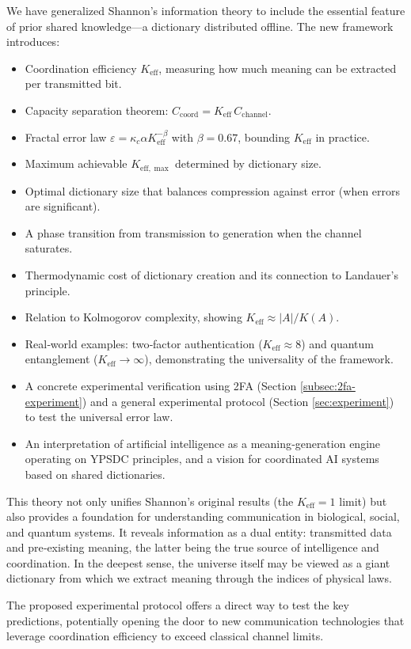 \documentclass[12pt,a4paper]{article}
\theoremstyle{remark}
\newcommand{\Keff}{K_{\mathrm{eff}}}
\newcommand{\Keffmax}{K_{\mathrm{eff},\max}}
\begin{document}
	We have generalized Shannon's information theory to include the essential feature of prior shared knowledge—a dictionary distributed offline. The new framework introduces:
	\begin{itemize}
		\item Coordination efficiency $\Keff$, measuring how much meaning can be extracted per transmitted bit.
		\item Capacity separation theorem: $C_{\text{coord}} = \Keff \, C_{\text{channel}}$.
		\item Fractal error law $\varepsilon = \kappa_c\alpha \Keff^{-\beta}$ with $\beta=0.67$, bounding $\Keff$ in practice.
		\item Maximum achievable $\Keffmax$ determined by dictionary size.
		\item Optimal dictionary size that balances compression against error (when errors are significant).
		\item A phase transition from transmission to generation when the channel saturates.
		\item Thermodynamic cost of dictionary creation and its connection to Landauer's principle.
		\item Relation to Kolmogorov complexity, showing $\Keff \approx |A|/K(A)$.
		\item Real‑world examples: two‑factor authentication ($\Keff \approx 8$) and quantum entanglement ($\Keff \to \infty$), demonstrating the universality of the framework.
		\item A concrete experimental verification using 2FA (Section \ref{subsec:2fa-experiment}) and a general experimental protocol (Section \ref{sec:experiment}) to test the universal error law.
		\item An interpretation of artificial intelligence as a meaning‑generation engine operating on YPSDC principles, and a vision for coordinated AI systems based on shared dictionaries.
	\end{itemize}
	
	This theory not only unifies Shannon's original results (the $\Keff=1$ limit) but also provides a foundation for understanding communication in biological, social, and quantum systems. It reveals information as a dual entity: transmitted data and pre‑existing meaning, the latter being the true source of intelligence and coordination. In the deepest sense, the universe itself may be viewed as a giant dictionary from which we extract meaning through the indices of physical laws.
	
	The proposed experimental protocol offers a direct way to test the key predictions, potentially opening the door to new communication technologies that leverage coordination efficiency to exceed classical channel limits.
	
\end{document}
